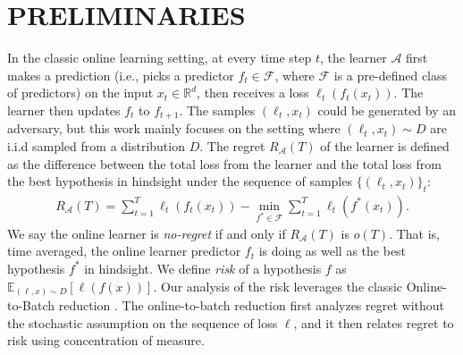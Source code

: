 


\section{PRELIMINARIES}
In the classic online learning setting, at every time step $t$, the learner $\mathcal{A}$ first makes a prediction (i.e., picks a predictor $f_t \in\mathcal{F}$, where $\mathcal{F}$ is a pre-defined class of predictors) on the input  $x_t\in\mathbb{R}^d$, then receives a loss $\ell_t(f_t(x_t))$. The learner then updates $f_t$ to $f_{t+1}$. The samples $(\ell_t,x_t)$ could be generated by an adversary, but this work mainly focuses on the setting where $(\ell_t,x_t)\sim D$ are i.i.d sampled from a distribution $D$.
The regret $R_{\mathcal{A}}(T)$ of the learner is defined as the difference between the total loss from the learner and the total loss from the best hypothesis in hindsight under the sequence of samples  $\{ (\ell_t, x_t) \}_t$:
\begin{align}
    R_{\mathcal{A}}(T) = \sum_{t=1}^T \ell_t(f_t(x_t)) - \min_{f^*\in\mathcal{F}}\sum_{t=1}^T\ell_t(f^*(x_t)).
\end{align} 
We say the online learner is \emph{no-regret} if and only if $R_{\mathcal{A}}(T)$ is $o(T)$. That is, time averaged, the online learner predictor $f_t$ is doing as well as the best hypothesis $f^*$ in hindsight. 
We define \emph{risk} of a hypothesis $f$ as $\mathbb{E}_{(\ell, x)\sim D}[\ell(f(x))]$. Our analysis of the risk leverages the classic Online-to-Batch reduction \citep{cesa2004generalization,JMLR:v15:hazan14a}. The online-to-batch reduction first analyzes  regret without the stochastic assumption on the sequence of loss $\ell$, and it then relates  regret to  risk using concentration of measure. 

